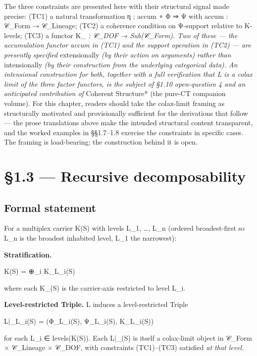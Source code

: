 \documentclass[11pt, openany]{book}
\newcommand{\sectionbreak}{\clearpage}
\begin{document}
The three constraints are presented here with their structural signal made precise: (TC1) a natural transformation η : accum ∘ Φ ⇒ Ψ with accum : 𝒞\_\allowbreak{}Form → 𝒞\_\allowbreak{}Lineage; (TC2) a coherence condition on Ψ-support relative to Κ-levels; (TC3) a functor Κ\_\allowbreak{}\textit{ : 𝒞\_\allowbreak{}DOF → Sub(𝒞\_\allowbreak{}Form). Two of these --- the accumulation functor accum in (TC1) and the support operation in (TC2) --- are presently specified }extensionally\textit{ (by their action on arguments) rather than }intensionally\textit{ (by their construction from the underlying categorical data). An intensional construction for both, together with a full verification that L is a colax limit of the three factor functors, is the subject of §1.10 open-question 4 and an anticipated contribution of }Coherent Structure* (the pure-CT companion volume). For this chapter, readers should take the colax-limit framing as structurally motivated and provisionally sufficient for the derivations that follow --- the prose translations above make the intended structural content transparent, and the worked examples in §§1.7–1.8 exercise the constraints in specific cases. The framing is load-bearing; the construction behind it is open.

\sectionbreak

\section{§1.3 --- Recursive decomposability}

\subsection{Formal statement}

For a multiplex carrier Κ(S) with levels {L\_\allowbreak{}1, …, L\_\allowbreak{}n} (ordered broadest-first so L\_\allowbreak{}n is the broadest inhabited level, L\_\allowbreak{}1 the narrowest):

\textbf{Stratification.}
\begin{Code}
Κ(S) = ⊕_i Κ_{L_i}(S)
\end{Code}
where each Κ\_(S) is the carrier-axis restricted to level L\_\allowbreak{}i.

\textbf{Level-restricted Triple.} L induces a level-restricted Triple
\begin{Code}
L|_{L_i}(S) = (Φ_{L_i}(S), Ψ_{L_i}(S), Κ_{L_i}(S))
\end{Code}
for each L\_\allowbreak{}i ∈ levels(Κ(S)). Each L|\_(S) is itself a colax-limit object in 𝒞\_\allowbreak{}Form × 𝒞\_\allowbreak{}Lineage × 𝒞\_\allowbreak{}DOF, with constraints (TC1)–(TC3) satisfied \textit{at that level}.
\end{document}
